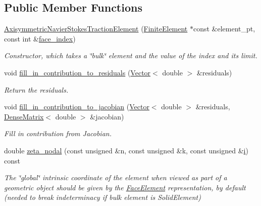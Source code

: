 \subsection*{Public Member Functions}
\begin{DoxyCompactItemize}
\item 
\hyperlink{classoomph_1_1AxisymmetricNavierStokesTractionElement_a8e0d081107ea8ad2e68db11abaf27ebc}{Axisymmetric\+Navier\+Stokes\+Traction\+Element} (\hyperlink{classoomph_1_1FiniteElement}{Finite\+Element} $\ast$const \&element\+\_\+pt, const int \&\hyperlink{classoomph_1_1FaceElement_a478d577ac6db67ecc80f1f02ae3ab170}{face\+\_\+index})
\begin{DoxyCompactList}\small\item\em Constructor, which takes a \char`\"{}bulk\char`\"{} element and the value of the index and its limit. \end{DoxyCompactList}\item 
void \hyperlink{classoomph_1_1AxisymmetricNavierStokesTractionElement_a083afe87cee838cf3674145ae99e66a4}{fill\+\_\+in\+\_\+contribution\+\_\+to\+\_\+residuals} (\hyperlink{classoomph_1_1Vector}{Vector}$<$ double $>$ \&residuals)
\begin{DoxyCompactList}\small\item\em Return the residuals. \end{DoxyCompactList}\item 
void \hyperlink{classoomph_1_1AxisymmetricNavierStokesTractionElement_ae271883f9813c9fd095cdd501ab7f4b1}{fill\+\_\+in\+\_\+contribution\+\_\+to\+\_\+jacobian} (\hyperlink{classoomph_1_1Vector}{Vector}$<$ double $>$ \&residuals, \hyperlink{classoomph_1_1DenseMatrix}{Dense\+Matrix}$<$ double $>$ \&jacobian)
\begin{DoxyCompactList}\small\item\em Fill in contribution from Jacobian. \end{DoxyCompactList}\item 
double \hyperlink{classoomph_1_1AxisymmetricNavierStokesTractionElement_a07065fabd6d28ac9efb7e50bc628a8e0}{zeta\+\_\+nodal} (const unsigned \&n, const unsigned \&k, const unsigned \&\hyperlink{cfortran_8h_adb50e893b86b3e55e751a42eab3cba82}{i}) const
\begin{DoxyCompactList}\small\item\em The \char`\"{}global\char`\"{} intrinsic coordinate of the element when viewed as part of a geometric object should be given by the \hyperlink{classoomph_1_1FaceElement}{Face\+Element} representation, by default (needed to break indeterminacy if bulk element is Solid\+Element) \end{DoxyCompactList}\item 

\end{DoxyCompactItemize}
